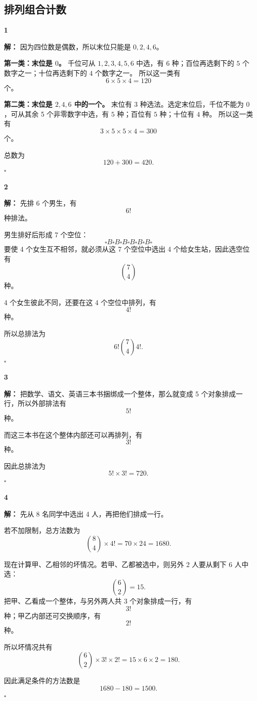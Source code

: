 \documentclass[11pt,a4paper,fontset=fandol]{ctexart}
\theoremstyle{formalexample}
\newenvironment{solution}{\par\noindent\textbf{解：}}{\hfill$\square$\par}
\begin{document}
\subsection*{排列组合计数}

\textbf{1}\begin{solution}
因为四位数是偶数，所以末位只能是 $0,2,4,6$。

\textbf{第一类：末位是 $0$。}  
千位可从 $1,2,3,4,5,6$ 中选，有 $6$ 种；百位再选剩下的 $5$ 个数字之一；十位再选剩下的 $4$ 个数字之一。  
所以这一类有
\[
6\times 5\times 4=120
\]
个。

\textbf{第二类：末位是 $2,4,6$ 中的一个。}  
末位有 $3$ 种选法。选定末位后，千位不能为 $0$，可从其余 5 个非零数字中选，有 $5$ 种；百位有 $5$ 种；十位有 $4$ 种。  
所以这一类有
\[
3\times 5\times 5\times 4=300
\]
个。

总数为
\[
120+300=420.
\]
\end{solution}

\textbf{2}\begin{solution}
先排 6 个男生，有
\[
6!
\]
种排法。

男生排好后形成 7 个空位：
\[
\square B \square B \square B \square B \square B \square B \square
\]
要使 4 个女生互不相邻，就必须从这 7 个空位中选出 4 个给女生站，因此选空位有
\[
\binom{7}{4}
\]
种。

4 个女生彼此不同，还要在这 4 个空位中排列，有
\[
4!
\]
种。

所以总排法为
\[
6!\binom{7}{4}4!.
\]
\end{solution}

\textbf{3}\begin{solution}
把数学、语文、英语三本书捆绑成一个整体，那么就变成 5 个对象排成一行，所以外部排法有
\[
5!
\]
种。

而这三本书在这个整体内部还可以再排列，有
\[
3!
\]
种。

因此总排法为
\[
5!\times 3!=720.
\]
\end{solution}

\textbf{4}\begin{solution}
先从 8 名同学中选出 4 人，再把他们排成一行。

若不加限制，总方法数为
\[
\binom{8}{4}\times 4!=70\times 24=1680.
\]

现在计算甲、乙相邻的坏情况。若甲、乙都被选中，则另外 2 人要从剩下 6 人中选：
\[
\binom{6}{2}=15.
\]
把甲、乙看成一个整体，与另外两人共 3 个对象排成一行，有
\[
3!
\]
种；甲乙内部还可交换顺序，有
\[
2!
\]
种。

所以坏情况共有
\[
\binom{6}{2}\times 3!\times 2!=15\times 6\times 2=180.
\]

因此满足条件的方法数是
\[
1680-180=1500.
\]
\end{solution}
\end{document}
